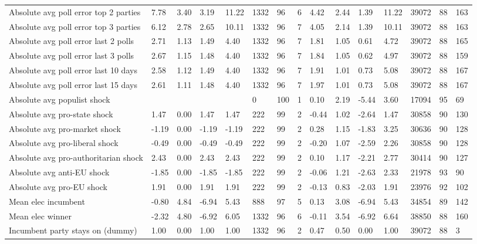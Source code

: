 \begin{longtable}{lllllllllllllll}
Absolute avg poll error top 2 parties & 7.78 & 3.40 & 3.19 & 11.22 & 1332 & 96 & 6 & 4.42 & 2.44 & 1.39 & 11.22 & 39072 & 88 & 163\\
Absolute avg poll error top 3 parties & 6.12 & 2.78 & 2.65 & 10.11 & 1332 & 96 & 7 & 4.05 & 2.14 & 1.39 & 10.11 & 39072 & 88 & 163\\
\addlinespace
Absolute avg poll error last 2 polls & 2.71 & 1.13 & 1.49 & 4.40 & 1332 & 96 & 7 & 1.81 & 1.05 & 0.61 & 4.72 & 39072 & 88 & 165\\
Absolute avg poll error last 3 polls & 2.67 & 1.15 & 1.48 & 4.40 & 1332 & 96 & 7 & 1.84 & 1.05 & 0.62 & 4.97 & 39072 & 88 & 159\\
Absolute avg poll error last 10 days & 2.58 & 1.12 & 1.49 & 4.40 & 1332 & 96 & 7 & 1.91 & 1.01 & 0.73 & 5.08 & 39072 & 88 & 167\\
Absolute avg poll error last 15 days & 2.61 & 1.11 & 1.48 & 4.40 & 1332 & 96 & 7 & 1.97 & 1.01 & 0.73 & 5.08 & 39072 & 88 & 167\\
Absolute avg populist shock &  &  &  &  & 0 & 100 & 1 & 0.10 & 2.19 & -5.44 & 3.60 & 17094 & 95 & 69\\
\addlinespace
Absolute avg pro-state shock & 1.47 & 0.00 & 1.47 & 1.47 & 222 & 99 & 2 & -0.44 & 1.02 & -2.64 & 1.47 & 30858 & 90 & 130\\
Absolute avg pro-market shock & -1.19 & 0.00 & -1.19 & -1.19 & 222 & 99 & 2 & 0.28 & 1.15 & -1.83 & 3.25 & 30636 & 90 & 128\\
Absolute avg pro-liberal shock & -0.49 & 0.00 & -0.49 & -0.49 & 222 & 99 & 2 & -0.20 & 1.07 & -2.59 & 2.26 & 30858 & 90 & 128\\
Absolute avg pro-authoritarian shock & 2.43 & 0.00 & 2.43 & 2.43 & 222 & 99 & 2 & 0.10 & 1.17 & -2.21 & 2.77 & 30414 & 90 & 127\\
Absolute avg anti-EU shock & -1.85 & 0.00 & -1.85 & -1.85 & 222 & 99 & 2 & -0.06 & 1.21 & -2.63 & 2.33 & 21978 & 93 & 90\\
\addlinespace
Absolute avg pro-EU shock & 1.91 & 0.00 & 1.91 & 1.91 & 222 & 99 & 2 & -0.13 & 0.83 & -2.03 & 1.91 & 23976 & 92 & 102\\
Mean elec incumbent & -0.80 & 4.84 & -6.94 & 5.43 & 888 & 97 & 5 & 0.13 & 3.08 & -6.94 & 5.43 & 34854 & 89 & 142\\
Mean elec winner & -2.32 & 4.80 & -6.92 & 6.05 & 1332 & 96 & 6 & -0.11 & 3.54 & -6.92 & 6.64 & 38850 & 88 & 160\\
Incumbent party stays on (dummy) & 1.00 & 0.00 & 1.00 & 1.00 & 1332 & 96 & 2 & 0.47 & 0.50 & 0.00 & 1.00 & 39072 & 88 & 3\\

\end{longtable}
